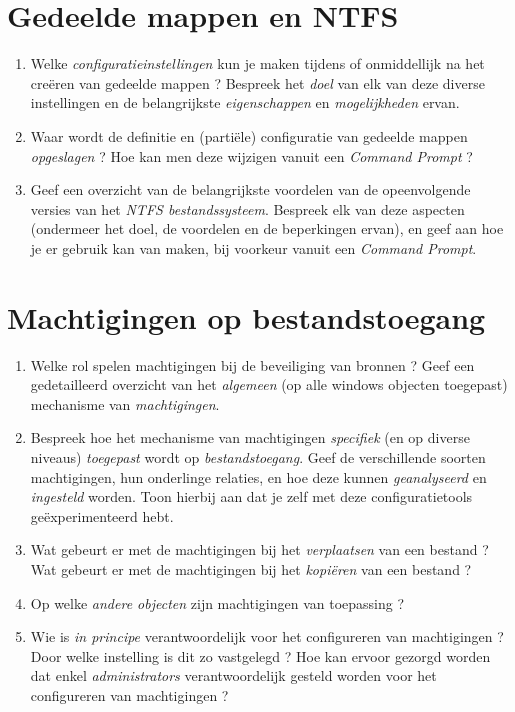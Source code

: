 \documentclass{report}
\begin{document}
	\section{Gedeelde mappen en NTFS}
	\begin{enumerate}
		\item Welke \textit{configuratieinstellingen} kun je maken tijdens of onmiddellijk na het creëren van gedeelde mappen ? Bespreek het \textit{doel} van elk van deze diverse instellingen en de belangrijkste \textit{eigenschappen} en \textit{mogelijkheden} ervan. 
		
		\item Waar wordt de definitie en (partiële) configuratie van gedeelde mappen \textit{opgeslagen} ? Hoe kan men deze wijzigen vanuit een \textit{Command Prompt} ? 
		
		\item Geef een overzicht van de belangrijkste voordelen van de opeenvolgende versies van het \textit{NTFS bestandssysteem}. Bespreek elk van deze aspecten (ondermeer het doel, de voordelen en de beperkingen ervan), en geef aan hoe je er gebruik kan van maken, bij voorkeur vanuit een \textit{Command Prompt}. 
	\end{enumerate}

	\section{Machtigingen op bestandstoegang }
	\begin{enumerate}
		\item Welke rol spelen machtigingen bij de beveiliging van bronnen ? Geef een gedetailleerd overzicht van het \textit{algemeen} (op alle windows objecten toegepast) mechanisme van \textit{machtigingen}.
		
		\item Bespreek hoe het mechanisme van machtigingen \textit{specifiek} (en op diverse niveaus) \textit{toegepast} wordt op \textit{bestandstoegang}. Geef de verschillende soorten machtigingen, hun onderlinge relaties, en hoe deze kunnen \textit{geanalyseerd} en \textit{ingesteld} worden. Toon hierbij aan dat je zelf met deze configuratietools geëxperimenteerd hebt.
		
		\item Wat gebeurt er met de machtigingen bij het \textit{verplaatsen} van een bestand ? Wat gebeurt er met de machtigingen bij het \textit{kopiëren} van een bestand ?
		
		\item Op welke \textit{andere objecten} zijn machtigingen van toepassing ?
		
		\item Wie is \textit{in principe} verantwoordelijk voor het configureren van machtigingen ? Door welke instelling is dit zo vastgelegd ? Hoe kan ervoor gezorgd worden dat enkel \textit{administrators} verantwoordelijk gesteld worden voor het configureren van machtigingen ?
		
	\end{enumerate}
\end{document}
